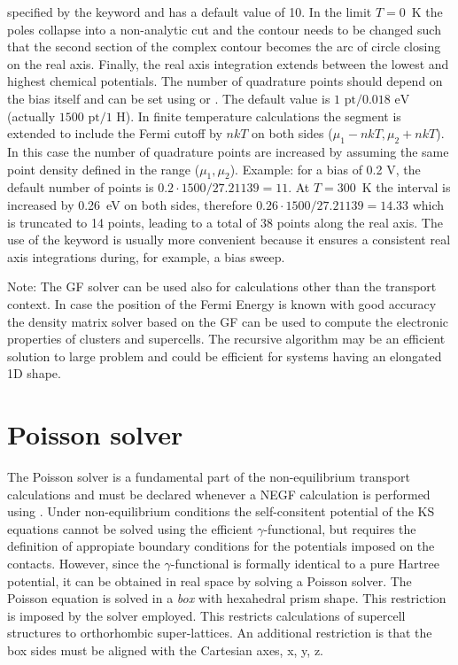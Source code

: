 specified by the keyword  and has a default value of 10.  In the
limit $T=0$~K the poles collapse into a non-analytic cut and the contour needs
to be changed such that the second section of the complex contour becomes the
arc of circle closing on the real axis.  Finally, the real axis integration
extends between the lowest and highest chemical potentials. The number of
quadrature points should depend on the bias itself and can be set using
 or . The default value is
$1\text{~pt}/0.018\text{~eV}$ (actually $1500\text{~pt}/1\text{~H}$). In finite
temperature calculations the segment is extended to include the Fermi cutoff by
$nkT$ on both sides ($\mu_1-nkT, \mu_2+nkT$). In this case the number of
quadrature points are increased by assuming the same point density defined in
the range ($\mu_1, \mu_2$).  Example: for a bias of 0.2 V, the default number of
points is $0.2\cdot1500/27.21139=11$. At $T=300$~K the interval is increased by
0.26~eV on both sides, therefore $0.26\cdot1500/27.21139=14.33$ which is
truncated to 14 points, leading to a total of 38 points along the real axis. The
use of the keyword  is usually more convenient because it
ensures a consistent real axis integrations during, for example, a bias sweep.

Note: The GF solver can be used also for calculations other than the transport
context. In case the position of the Fermi Energy is known with good accuracy
the density matrix solver based on the GF can be used to compute the electronic
properties of clusters and supercells. The recursive algorithm may be an
efficient solution to large problem and could be efficient for systems having an
elongated 1D shape.

\section{Poisson solver}

The Poisson solver is a fundamental part of the non-equilibrium transport
calculations and must be declared whenever a NEGF calculation is performed using
. Under non-equilibrium conditions the
self-consitent potential of the KS equations cannot be solved using the
efficient $\gamma$-functional, but requires the definition of appropiate
boundary conditions for the potentials imposed on the contacts. However, since
the $\gamma$-functional is formally identical to a pure Hartree potential, it
can be obtained in real space by solving a Poisson solver.  The Poisson equation
is solved in a {\em box} with hexahedral prism shape. This restriction is
imposed by the solver employed. This restricts calculations of supercell
structures to orthorhombic super-lattices.  An additional restriction is that
the box sides must be aligned with the Cartesian axes, x, y, z.

